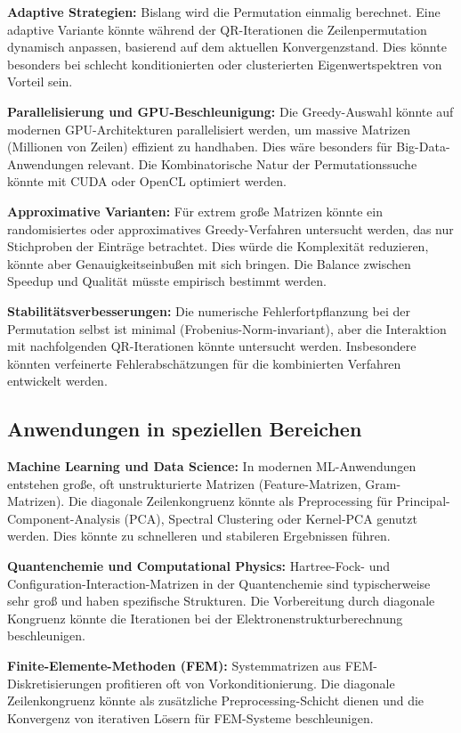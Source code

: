 \documentclass[a4paper,12pt]{article}
\theoremstyle{definition}
\begin{document}
\textbf{Adaptive Strategien:} Bislang wird die Permutation einmalig berechnet. Eine adaptive Variante könnte während der QR-Iterationen die Zeilenpermutation dynamisch anpassen, basierend auf dem aktuellen Konvergenzstand. Dies könnte besonders bei schlecht konditionierten oder clusterierten Eigenwertspektren von Vorteil sein.

\textbf{Parallelisierung und GPU-Beschleunigung:} Die Greedy-Auswahl könnte auf modernen GPU-Architekturen parallelisiert werden, um massive Matrizen (Millionen von Zeilen) effizient zu handhaben. Dies wäre besonders für Big-Data-Anwendungen relevant. Die Kombinatorische Natur der Permutationssuche könnte mit CUDA oder OpenCL optimiert werden.

\textbf{Approximative Varianten:} Für extrem große Matrizen könnte ein randomisiertes oder approximatives Greedy-Verfahren untersucht werden, das nur Stichproben der Einträge betrachtet. Dies würde die Komplexität reduzieren, könnte aber Genauigkeitseinbußen mit sich bringen. Die Balance zwischen Speedup und Qualität müsste empirisch bestimmt werden.

\textbf{Stabilitätsverbesserungen:} Die numerische Fehlerfortpflanzung bei der Permutation selbst ist minimal (Frobenius-Norm-invariant), aber die Interaktion mit nachfolgenden QR-Iterationen könnte untersucht werden. Insbesondere könnten verfeinerte Fehlerabschätzungen für die kombinierten Verfahren entwickelt werden.

\subsection*{Anwendungen in speziellen Bereichen}

\textbf{Machine Learning und Data Science:} In modernen ML-Anwendungen entstehen große, oft unstrukturierte Matrizen (Feature-Matrizen, Gram-Matrizen). Die diagonale Zeilenkongruenz könnte als Preprocessing für Principal-Component-Analysis (PCA), Spectral Clustering oder Kernel-PCA genutzt werden. Dies könnte zu schnelleren und stabileren Ergebnissen führen.

\textbf{Quantenchemie und Computational Physics:} Hartree-Fock- und Configuration-Interaction-Matrizen in der Quantenchemie sind typischerweise sehr groß und haben spezifische Strukturen. Die Vorbereitung durch diagonale Kongruenz könnte die Iterationen bei der Elektronenstrukturberechnung beschleunigen.

\textbf{Finite-Elemente-Methoden (FEM):} Systemmatrizen aus FEM-Diskretisierungen profitieren oft von Vorkonditionierung. Die diagonale Zeilenkongruenz könnte als zusätzliche Preprocessing-Schicht dienen und die Konvergenz von iterativen Lösern für FEM-Systeme beschleunigen.
\end{document}
